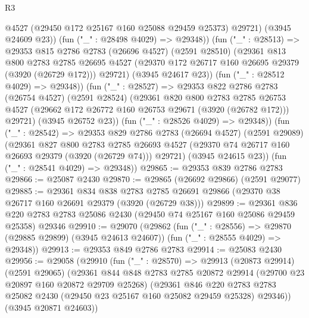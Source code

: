 \begin{lexlean}{R3}
\begin{coremodule}
                @4527
                (@29450 @172 @25167 @160 @25088 @29459 @25373)
                @29721)
              (@3945 @24609 @23))
            (fun ("_" : @28498 @4029) => @29348))
          (fun ("_" : @28513) =>
          @29353
            @815
            @2786
            @2783
            (@26696 @4527)
            (@2591 @28510)
            (@29361
              @813
              @800
              @2783
              @2785
              @26695
              @4527
              (@29370 @172 @26717 @160 @26695 @29379 (@3920 (@26729 @172)))
              @29721)
            (@3945 @24617 @23))
          (fun ("_" : @28512 @4029) => @29348))
        (fun ("_" : @28527) =>
        @29353
          @822
          @2786
          @2783
          (@26754 @4527)
          (@2591 @28524)
          (@29361
            @820
            @800
            @2783
            @2785
            @26753
            @4527
            (@29662 @172 @26772 @160 @26753 @29671 (@3920 (@26782 @172)))
            @29721)
          (@3945 @26752 @23))
        (fun ("_" : @28526 @4029) => @29348))
      (fun ("_" : @28542) =>
      @29353
        @829
        @2786
        @2783
        (@26694 @4527)
        (@2591 @29089)
        (@29361
          @827
          @800
          @2783
          @2785
          @26693
          @4527
          (@29370 @74 @26717 @160 @26693 @29379 (@3920 (@26729 @74)))
          @29721)
        (@3945 @24615 @23))
      (fun ("_" : @28541 @4029) => @29348))
@29865 := @29353 @839 @2786 @2783
@29866 := @25087 @2430
@29870 := @29865 (@26692 @29866) (@2591 @29077)
@29885 := @29361
    @834
    @838
    @2783
    @2785
    @26691
    @29866
    (@29370 @38 @26717 @160 @26691 @29379 (@3920 (@26729 @38)))
@29899 := @29361
    @836
    @220
    @2783
    @2783
    @25086
    @2430
    (@29450 @74 @25167 @160 @25086 @29459 @25358)
    @29346
@29910 := @29070
    (@29862
      (fun ("_" : @28556) => @29870 (@29885 @29899) (@3945 @24613 @24607))
      (fun ("_" : @28555 @4029) => @29348))
@29913 := @29353 @849 @2786 @2783
@29914 := @25083 @2430
@29956 := @29058
    (@29910
      (fun ("_" : @28570) =>
      @29913
        (@20873 @29914)
        (@2591 @29065)
        (@29361
          @844
          @848
          @2783
          @2785
          @20872
          @29914
          (@29700 @23 @20897 @160 @20872 @29709 @25268)
          (@29361
            @846
            @220
            @2783
            @2783
            @25082
            @2430
            (@29450 @23 @25167 @160 @25082 @29459 @25328)
            @29346))
        (@3945 @20871 @24603))

\end{coremodule}
\end{lexlean}
